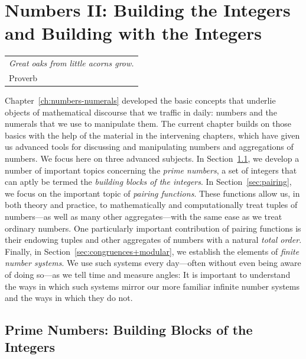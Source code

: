
\chapter{Numbers II:
Building the Integers and Building with the Integers}
\label{ch:numbers-advanced}

\hfill
\begin{tabular}{l}
{\em Great oaks from little acorns grow.} \\
\hfill {\small Proverb}
\end{tabular}

\vspace*{.5in}

\noindent
Chapter~\ref{ch:numbers-numerals} developed the basic concepts that underlie objects of mathematical discourse that we traffic in daily: numbers and the numerals that we use to manipulate them.  The current chapter builds on those basics with the help of the material in the intervening chapters, which have given us advanced tools for discussing and manipulating numbers and aggregations of numbers.  We focus here on three advanced subjects.  In Section~\ref{sec:primes}, we develop a number of important topics concerning the {\em prime numbers}, a set of integers that can aptly be termed the {\it building blocks of the integers}.  In
Section~\ref{sec:pairing}, we focus on the important topic of {\it pairing functions}.  These functions allow us, in both theory and practice, to mathematically and computationally treat tuples of numbers---as well as many other aggregates---with the same ease as we treat ordinary numbers.  One particularly important contribution of pairing functions is their endowing tuples and other aggregates of numbers with a natural {\em total order}.  Finally, in Section~\ref{sec:congruences+modular}, we establish the elements of {\em finite number systems}.  We use such systems every day---often without even being aware of doing so---as we tell time and measure angles: It is important to understand the ways in which such systems mirror our more familiar infinite number systems and the ways in which they do not.
 

\section{Prime Numbers: Building Blocks of the Integers}
\label{sec:primes}

